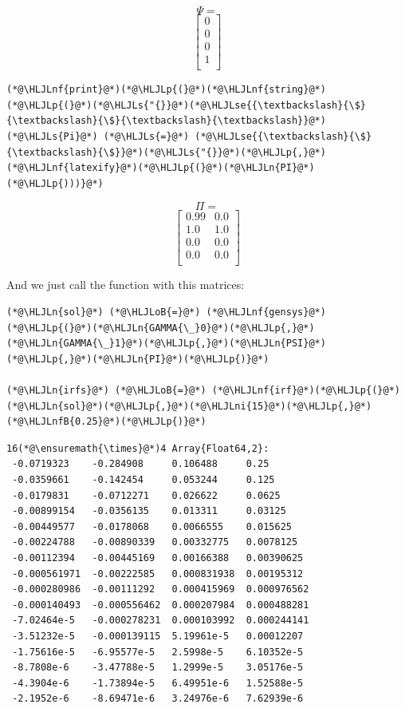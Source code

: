 \documentclass[12pt,a4paper]{article}
\newcommand{\HLJLn}[1]{#1}
\newcommand{\HLJLnf}[1]{\textcolor[RGB]{66,102,213}{#1}}
\newcommand{\HLJLs}[1]{\textcolor[RGB]{201,61,57}{#1}}
\newcommand{\HLJLse}[1]{\textcolor[RGB]{59,151,46}{#1}}
\newcommand{\HLJLnfB}[1]{\textcolor[RGB]{59,151,46}{#1}}
\newcommand{\HLJLni}[1]{\textcolor[RGB]{59,151,46}{#1}}
\newcommand{\HLJLoB}[1]{\textcolor[RGB]{102,102,102}{\textbf{#1}}}
\newcommand{\HLJLp}[1]{#1}
\begin{document}
$$\Psi = $$\begin{equation}
\left[
\begin{array}{c}
0 \\
0 \\
0 \\
1 \\
\end{array}
\right]
\end{equation}


\begin{lstlisting}
(*@\HLJLnf{print}@*)(*@\HLJLp{(}@*)(*@\HLJLnf{string}@*)(*@\HLJLp{(}@*)(*@\HLJLs{"{}}@*)(*@\HLJLse{{\textbackslash}{\$}{\textbackslash}{\$}{\textbackslash}{\textbackslash}}@*)(*@\HLJLs{Pi}@*) (*@\HLJLs{=}@*) (*@\HLJLse{{\textbackslash}{\$}{\textbackslash}{\$}}@*)(*@\HLJLs{"{}}@*)(*@\HLJLp{,}@*)(*@\HLJLnf{latexify}@*)(*@\HLJLp{(}@*)(*@\HLJLn{PI}@*)(*@\HLJLp{)))}@*)
\end{lstlisting}

$$\Pi = $$\begin{equation}
\left[
\begin{array}{cc}
0.99 & 0.0 \\
1.0 & 1.0 \\
0.0 & 0.0 \\
0.0 & 0.0 \\
\end{array}
\right]
\end{equation}


And we just call the function with this matrices:


\begin{lstlisting}
(*@\HLJLn{sol}@*) (*@\HLJLoB{=}@*) (*@\HLJLnf{gensys}@*)(*@\HLJLp{(}@*)(*@\HLJLn{GAMMA{\_}0}@*)(*@\HLJLp{,}@*)(*@\HLJLn{GAMMA{\_}1}@*)(*@\HLJLp{,}@*)(*@\HLJLn{PSI}@*)(*@\HLJLp{,}@*)(*@\HLJLn{PI}@*)(*@\HLJLp{)}@*)

(*@\HLJLn{irfs}@*) (*@\HLJLoB{=}@*) (*@\HLJLnf{irf}@*)(*@\HLJLp{(}@*)(*@\HLJLn{sol}@*)(*@\HLJLp{,}@*)(*@\HLJLni{15}@*)(*@\HLJLp{,}@*)(*@\HLJLnfB{0.25}@*)(*@\HLJLp{)}@*)
\end{lstlisting}

\begin{lstlisting}
16(*@\ensuremath{\times}@*)4 Array{Float64,2}:
 -0.0719323    -0.284908     0.106488     0.25       
 -0.0359661    -0.142454     0.053244     0.125      
 -0.0179831    -0.0712271    0.026622     0.0625     
 -0.00899154   -0.0356135    0.013311     0.03125    
 -0.00449577   -0.0178068    0.0066555    0.015625   
 -0.00224788   -0.00890339   0.00332775   0.0078125  
 -0.00112394   -0.00445169   0.00166388   0.00390625 
 -0.000561971  -0.00222585   0.000831938  0.00195312 
 -0.000280986  -0.00111292   0.000415969  0.000976562
 -0.000140493  -0.000556462  0.000207984  0.000488281
 -7.02464e-5   -0.000278231  0.000103992  0.000244141
 -3.51232e-5   -0.000139115  5.19961e-5   0.00012207 
 -1.75616e-5   -6.95577e-5   2.5998e-5    6.10352e-5 
 -8.7808e-6    -3.47788e-5   1.2999e-5    3.05176e-5 
 -4.3904e-6    -1.73894e-5   6.49951e-6   1.52588e-5 
 -2.1952e-6    -8.69471e-6   3.24976e-6   7.62939e-6
\end{lstlisting}
\end{document}
